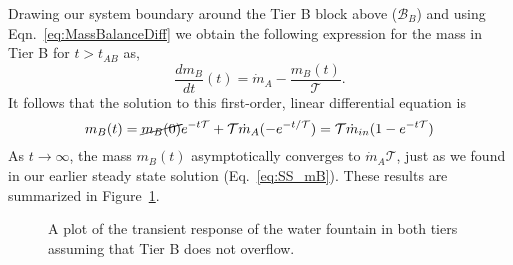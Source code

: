 Drawing our system boundary around the Tier B block above ($\mathcal{B}_B$) and using Eqn.~\eqref{eq:MassBalanceDiff} we obtain the following expression for the mass in Tier B for $t > t_{AB}$ as,
\begin{equation}
\frac{dm_B}{dt}(t) = \dot{m}_{A} - \frac{m_B(t)}{\mathcal{T}}.
\end{equation}
It follows that the solution to this first-order, linear differential equation is
\begin{equation}
m_B(t)= \cancel{m_B(0)}e^{-t\mathcal{T}} + \mathcal{T}\dot{m}_{A} (-e^{-t/\mathcal{T}})=  \mathcal{T}\dot{m}_{in} (1-e^{-t\mathcal{T}})
\end{equation}
As $t\rightarrow\infty$, the mass $m_B(t)$ asymptotically converges to $\dot{m}_A\mathcal{T}$, just as we found in our earlier steady state solution (Eq.~\eqref{eq:SS_mB}). These results are summarized in Figure~\ref{fig:FountainPlot}. 

\begin{figure}
\begin{center}
\end{center}
\caption{A plot of the transient response of the water fountain in both tiers assuming that Tier B does not overflow.}\label{fig:FountainPlot}
\end{figure}

